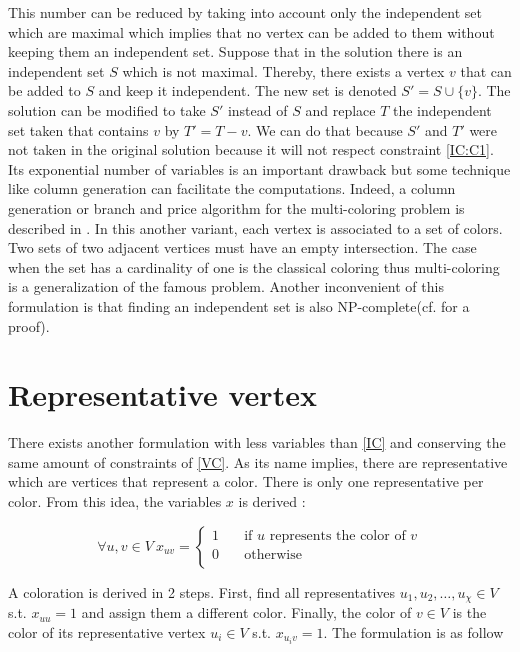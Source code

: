 This number can be reduced by taking into account only the independent set which are maximal which implies that no vertex can be added to them without keeping them an independent set. Suppose that in the solution there is an independent set $S$ which is not maximal. Thereby, there exists a vertex $v$ that can be added to $S$ and keep it independent. The new set is denoted $S\prime = S \cup \{v\}$. The solution can be modified to take $S\prime$ instead of $S$ and replace $T$ the independent set taken that contains $v$ by $T\prime= T - v$. We can do that because $S\prime$ and $T\prime$ were not taken in the original solution because it will not respect constraint \ref{IC:C1}. \\

Its exponential number of variables is an important drawback but some technique like column generation can facilitate the computations. Indeed, a column generation or branch and price algorithm for the multi-coloring problem is described in \cite{BranchAndPrice}. In this another variant, each vertex is associated to a set of colors. Two sets of two adjacent vertices must have an empty intersection. The case when the set has a cardinality of one is the classical coloring thus multi-coloring is a generalization of the famous problem. Another inconvenient of this formulation is that finding an independent set is also NP-complete(cf. \cite{Complexity} for a proof).

\section{Representative vertex}
\label{sec:RV}

There exists another formulation with less variables than \ref{IC} and conserving the same amount of constraints of \ref{VC}. As its name implies, there are representative which are vertices that represent a color. There is only one representative per color.
From this idea, the variables $x$ is derived :

\[\forall u,v \in V\ x_{uv} =
  \begin{cases}
    1       & \quad \text{if $u$ represents the color of $v$}  \\
    0  		& \quad \text{otherwise }\\
  \end{cases}
\]

A coloration is derived in 2 steps. First, find all representatives $u_1,u_2,\dots, u_{\chi} \in V$ s.t. $x_{uu}=1$ and assign them a different color. Finally, the color of $v \in V$ is the color of its representative vertex $u_i \in V$ s.t. $x_{u_{i}v}=1$. The formulation is as follow


